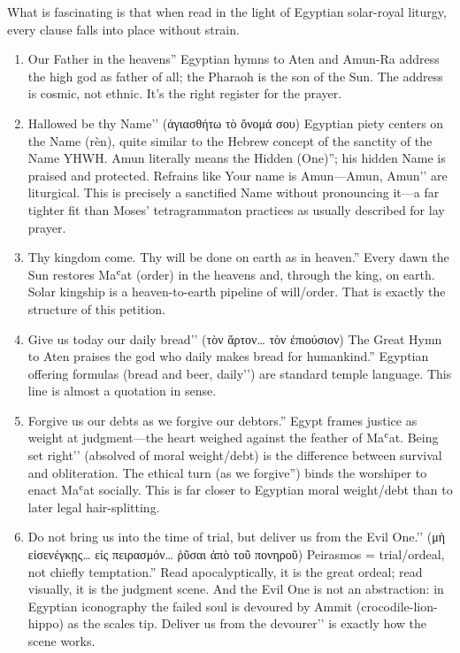 What is fascinating is that when read in the light of Egyptian solar-royal liturgy, every clause falls into place without strain.
\begin{enumerate}
    \def\labelenumi{(\alph{enumi})}
    \item
    Our Father in the heavens'' Egyptian hymns to Aten and Amun-Ra address the high god as father of all; the Pharaoh is the son of the Sun. The address is cosmic, not ethnic. It's the right register for the prayer.
    \item Hallowed be thy Name’’ (ἁγιασθήτω τὸ ὄνομά σου) Egyptian piety centers on the Name (rèn), quite similar to the Hebrew concept of the sanctity of the Name YHWH.
    Amun literally means the Hidden (One)''; his hidden Name is praised and protected. Refrains like Your name is Amun---Amun, Amun’’ are liturgical.
    This is precisely a sanctified Name without pronouncing it---a far tighter fit than Moses’ tetragrammaton practices as usually described for lay prayer.
    \item
    Thy kingdom come. Thy will be done on earth as in heaven.'' Every dawn the Sun restores Maʿat (order) in the heavens and, through the king, on earth. Solar kingship is a heaven-to-earth pipeline of will/order. That is exactly the structure of this petition.
    \item Give us today our daily bread’’ (τὸν ἄρτον\ldots{} τὸν ἐπιούσιον) The Great Hymn to Aten praises the god who daily makes bread for humankind.'' Egyptian offering formulas (bread and beer, daily’’) are standard temple language.
    This line is almost a quotation in sense.
    \item
    Forgive us our debts as we forgive our debtors.'' Egypt frames justice as weight at judgment---the heart weighed against the feather of Maʿat. Being set right’’ (absolved of moral weight/debt) is the difference between survival and obliteration.
    The ethical turn (as we forgive'') binds the worshiper to enact Maʿat socially. This is far closer to Egyptian moral weight/debt than to later legal hair-splitting.
    \item Do not bring us into the time of trial, but deliver us from the Evil One.’’ (μὴ εἰσενέγκῃς\ldots{} εἰς πειρασμόν\ldots{} ῥῦσαι ἀπὸ τοῦ πονηροῦ) Peirasmos = trial/ordeal, not chiefly temptation.'' Read apocalyptically, it is the great ordeal; read visually, it is the judgment scene. And the Evil One is not an abstraction: in Egyptian iconography the failed soul is devoured by Ammit (crocodile-lion-hippo) as the scales tip. Deliver us from the devourer’’ is exactly how the scene works.

\end{enumerate}
